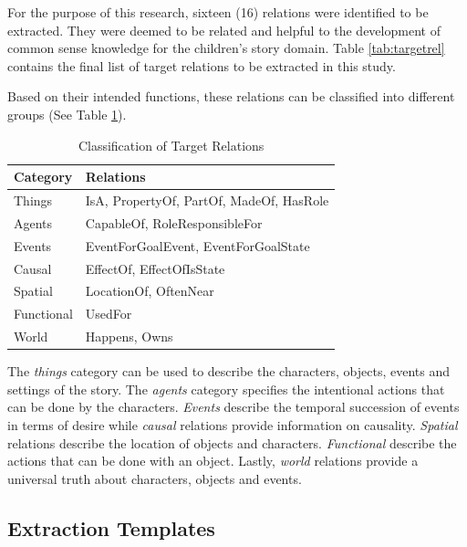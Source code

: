 For the purpose of this research, sixteen (16) relations were identified to be extracted. They were deemed to be related and helpful to the development of common sense knowledge for the children's story domain. Table \ref{tab:targetrel} contains the final list of target relations to be extracted in this study.

Based on their intended functions, these relations can be classified into different groups (See Table \ref{tab:classification}). 

\begin{table}[H]   %
\centering
\caption{Classification of Target Relations} \vspace{0.25em}
\begin{tabular}{|p{4cm}|p{6.5cm}|} \hline
\textbf{Category} & \textbf{Relations} \\ \hline
Things		& IsA, PropertyOf, PartOf, MadeOf, HasRole \\ \hline
Agents		& CapableOf, RoleResponsibleFor \\ \hline
Events		& EventForGoalEvent, EventForGoalState \\ \hline
Causal		& EffectOf, EffectOfIsState \\ \hline
Spatial		& LocationOf, OftenNear \\ \hline
Functional	& UsedFor \\ \hline
World		& Happens, Owns \\ \hline
\end{tabular}
\label{tab:classification}
\end{table}

The \textit{things} category can be used to describe the characters, objects, events and settings of the story. The \textit{agents} category specifies the intentional actions that can be done by the characters. \textit{Events} describe the temporal succession of events in terms of desire while \textit{causal} relations provide information on causality. \textit{Spatial} relations describe the location of objects and characters. \textit{Functional} describe the actions that can be done with an object. Lastly, \textit{world} relations provide a universal truth about characters, objects and events.

\subsection{Extraction Templates}
\label{sec:extractiontemplates}

